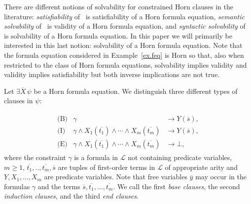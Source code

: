 \documentclass[acmsmall]{acmart}
\theoremstyle{plain}
\theoremstyle{definition}
\newcommand{\calL}{\mathcal{L}}
\newcommand{\mybar}[1]{\overline{#1}}
\newcommand{\impl}{\rightarrow} %
\begin{document}
There are different notions of solvability for constrained Horn clauses in the literature:
{\em satisfiability} of~\cite{Gurfinkel19Science} is satisfiability of a Horn formula equation,
{\em semantic solvability} of~\cite{Ruemmer13Classifying} is validity of a Horn formula equation, and
{\em syntactic solvability} of~\cite{Ruemmer13Classifying} is solvability of a Horn formula equation.
In this paper we will primarily be interested in this last notion: solvability of a Horn formula equation.
Note that the formula equation considered in Example~\ref{ex.feq} is Horn so that, also when restricted
 to the class of Horn formula equations, solvability implies validity and validity implies satisfiability but
 both inverse implications are not true.

Let $\exists \mybar{X}\, \psi$ be a Horn formula equation.
We distinguish three different types of clauses in $\psi$:

%
\begin{align*}
	\begin{array}{crl}
		\text{(B)} &\gamma &\impl Y(\mybar{s}),   \\
		\text{(I)} &\gamma \land X_{1}(\mybar{t_1}) \land \cdots \land X_{m}(\mybar{t_m}) &\impl Y(\mybar{s}),  \\
		\text{(E)} &\gamma \land X_{1}(\mybar{t_1}) \land \cdots \land X_{m}(\mybar{t_m}) &\impl \bot, 
	\end{array}
\end{align*}
%
where the constraint $\gamma$ is a formula in $\calL$ not containing predicate variables,
$m \geq 1$, $\mybar{t_1},..,\mybar{t_m},\mybar{s}$ are
tuples of first-order terms in $\calL$ of appropriate arity and $Y,X_1,...,X_m$ are predicate variables. 
Note that free variables $\mybar{y}$ may occur in the formulas $\gamma$ and the terms
$\mybar{s}, \mybar{t_1},\ldots,\mybar{t_m}$.
We call the first {\em base clauses}, the second {\em induction clauses}, and the third {\em end clauses}.
\end{document}
